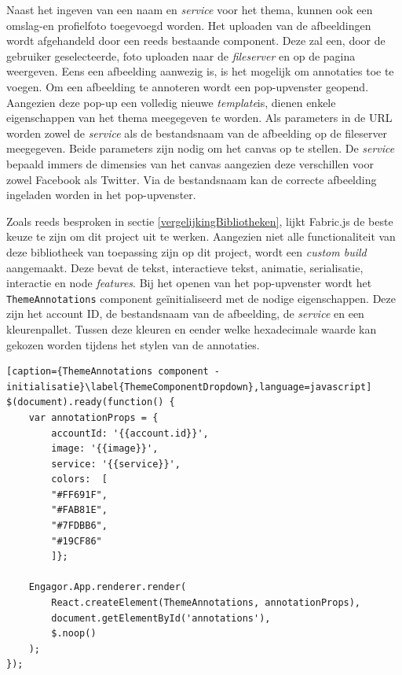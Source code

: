 Naast het ingeven van een naam en \textit{service} voor het thema, kunnen ook een omslag-en profielfoto toegevoegd worden. Het uploaden van de afbeeldingen wordt afgehandeld door een reeds bestaande component. Deze zal een, door de gebruiker geselecteerde, foto uploaden naar de \textit{fileserver} en op de pagina weergeven. Eens een afbeelding aanwezig is, is het mogelijk om annotaties toe te voegen. Om een afbeelding te annoteren wordt een pop-upvenster geopend. Aangezien deze pop-up een volledig nieuwe \textit{template}is, dienen enkele eigenschappen van het thema meegegeven te worden. Als parameters in de URL worden zowel de \textit{service} als de bestandsnaam van de afbeelding op de fileserver meegegeven. Beide parameters zijn nodig om het canvas op te stellen. De \textit{service} bepaald immers de dimensies van het canvas aangezien deze verschillen voor zowel Facebook als Twitter. Via de bestandsnaam kan de correcte afbeelding ingeladen worden in het pop-upvenster.

Zoals reeds besproken in sectie \ref{vergelijkingBibliotheken}, lijkt Fabric.js de beste keuze te zijn om dit project uit te werken. Aangezien niet alle functionaliteit van deze bibliotheek van toepassing zijn op dit project, wordt een \textit{custom build} aangemaakt. Deze bevat de tekst, interactieve tekst, animatie, serialisatie, interactie en node \textit{features}. Bij het openen van het pop-upvenster wordt het \lstinline{ThemeAnnotations} component ge\"{i}nitialiseerd met de nodige eigenschappen. Deze zijn het account ID, de bestandsnaam van de afbeelding, de \textit{service} en een kleurenpallet. Tussen deze kleuren en eender welke hexadecimale waarde kan gekozen worden tijdens het stylen van de annotaties.

\begin{lstlisting}[caption={ThemeAnnotations component - initialisatie}\label{ThemeComponentDropdown},language=javascript]
$(document).ready(function() {
	var annotationProps = {
		accountId: '{{account.id}}',
		image: '{{image}}',
		service: '{{service}}',
		colors:  [
		"#FF691F",
		"#FAB81E",
		"#7FDBB6",
		"#19CF86"
		]};
		
	Engagor.App.renderer.render(
		React.createElement(ThemeAnnotations, annotationProps),
		document.getElementById('annotations'),
		$.noop()
	);
});
\end{lstlisting}

